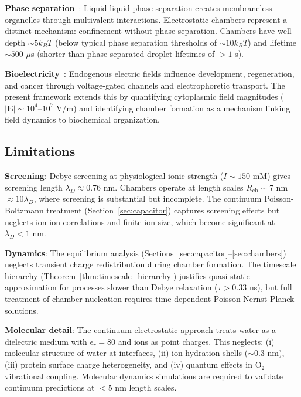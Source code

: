\documentclass[twocolumn,10pt,aps,prd,superscriptaddress,floatfix,nofootinbib]{revtex4-2}
\theoremstyle{remark}
\begin{document}
\textbf{Phase separation}~\cite{Hyman2014,Banani2017}: Liquid-liquid phase separation creates membraneless organelles through multivalent interactions. Electrostatic chambers represent a distinct mechanism: confinement without phase separation. Chambers have well depth $\sim 5 k_B T$ (below typical phase separation thresholds of $\sim 10 k_B T$) and lifetime $\sim 500$ $\mu$s (shorter than phase-separated droplet lifetimes of $>1$ s).

\textbf{Bioelectricity}~\cite{Levin2014}: Endogenous electric fields influence development, regeneration, and cancer through voltage-gated channels and electrophoretic transport. The present framework extends this by quantifying cytoplasmic field magnitudes ($|\mathbf{E}| \sim 10^4$--$10^7$ V/m) and identifying chamber formation as a mechanism linking field dynamics to biochemical organization.

\subsection{Limitations}

\textbf{Screening}: Debye screening at physiological ionic strength ($I \sim 150$ mM) gives screening length $\lambda_D \approx 0.76$ nm. Chambers operate at length scales $R_{\mathrm{ch}} \sim 7$ nm $\approx 10\lambda_D$, where screening is substantial but incomplete. The continuum Poisson-Boltzmann treatment (Section~\ref{sec:capacitor}) captures screening effects but neglects ion-ion correlations and finite ion size, which become significant at $\lambda_D < 1$ nm.

\textbf{Dynamics}: The equilibrium analysis (Sections~\ref{sec:capacitor}--\ref{sec:chambers}) neglects transient charge redistribution during chamber formation. The timescale hierarchy (Theorem~\ref{thm:timescale_hierarchy}) justifies quasi-static approximation for processes slower than Debye relaxation ($\tau > 0.33$ ns), but full treatment of chamber nucleation requires time-dependent Poisson-Nernst-Planck solutions.

\textbf{Molecular detail}: The continuum electrostatic approach treats water as a dielectric medium with $\epsilon_r = 80$ and ions as point charges. This neglects: (i) molecular structure of water at interfaces, (ii) ion hydration shells ($\sim 0.3$ nm), (iii) protein surface charge heterogeneity, and (iv) quantum effects in O$_2$ vibrational coupling. Molecular dynamics simulations are required to validate continuum predictions at $<5$ nm length scales.
\end{document}
